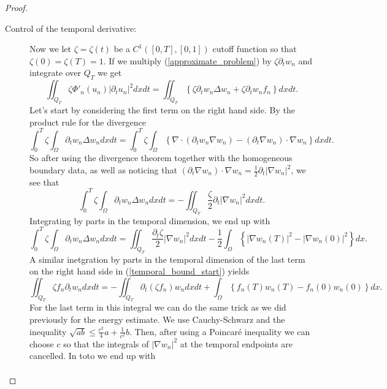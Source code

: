 \documentclass[11pt, a4paper]{article}
\begin{document}
\begin{proof}
\begin{description}
	\item[Control of the temporal derivative:] Now we let $\zeta = \zeta(t)$ be a $C^1([0,T],[0,1])$ cutoff function so that $\zeta(0) = \zeta(T) = 1$. If we multiply (\ref{approximate_problem}) by $\zeta \partial_tw_n$ and integrate over $Q_T$ we get
	\begin{equation}
	\label{temporal_bound_start}
	\iint_{Q_T}\zeta \Phi'_n(u_n)|\partial_t u_n|^2 dxdt = \iint_{Q_T} \left\{ \zeta \partial_t w_n \Delta w_n + \zeta \partial_t w_n f_n \right\} dxdt.
	\end{equation}
	Let's start by considering the first term on the right hand side. By the product rule for the divergence
	\begin{equation*}
	\int_0^T \zeta \int_\Omega \partial_t w_n \Delta w_n dxdt = \int_0^T \zeta \int_\Omega \left\{ \nabla \cdot (\partial_t w_n \nabla w_n) - (\partial_t \nabla w_n) \cdot \nabla w_n \right\} dx dt.
	\end{equation*}
	So after using the divergence theorem together with the homogeneous boundary data, as well as noticing that $(\partial_t \nabla w_n) \cdot \nabla w_n = \frac{1}{2}\partial_t |\nabla w_n|^2$, we see that
	\begin{equation*}
	\int_0^T \zeta \int_\Omega \partial_t w_n \Delta w_n dxdt = -\iint_{Q_T}\frac{\zeta}{2}\partial_t |\nabla w_n|^2 dxdt.
	\end{equation*}
	Integrating by parts in the temporal dimension, we end up with
	\begin{equation*}
	\int_0^T \zeta \int_\Omega \partial_t w_n \Delta w_n dxdt = \iint_{Q_T} \frac{\partial_t \zeta}{2} |\nabla w_n|^2 dxdt - \frac{1}{2}\int_\Omega \left\{ |\nabla w_n(T)|^2 - |\nabla w_n(0)|^2 \right\} dx.
	\end{equation*}
	A similar inetgration by parts in the temporal dimension of the last term on the right hand side in (\ref{temporal_bound_start}) yields
	\begin{equation*}
	\iint_{Q_T} \zeta f_n \partial_t w_n dxdt = -\iint_{Q_T} \partial_t (\zeta f_n) w_n dxdt + \int_\Omega \left\{ f_n(T)w_n(T) - f_n(0)w_n(0) \right \} dx.
	\end{equation*}
	For the last term in this integral we can do the same trick as we did previously for the energy estimate. We use Cauchy-Schwarz and the inequality $\sqrt{ab} \leq \frac{c^2}{4}a + \frac{1}{c^2}b$. Then, after using a Poincaré inequality we can choose $c$ so that the integrals of $|\nabla w_n|^2$ at the temporal endpoints are cancelled. In toto we end up with
	\begin{align*}

\end{align*}
\end{description}
\end{proof}
\end{document}
